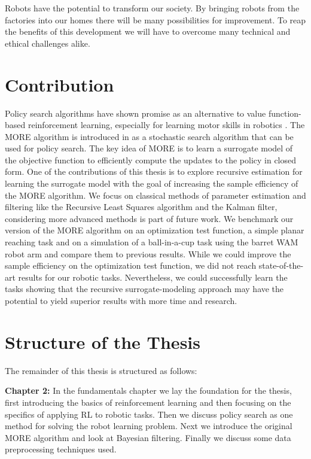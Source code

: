 Robots have the potential to transform our society. By
bringing robots from the factories into our homes there will be many
possibilities for improvement. To reap the benefits of this
development we will have to overcome many technical and
ethical challenges alike.



\section{Contribution}
Policy search algorithms have shown promise as an alternative
to value function-based reinforcement learning, especially for learning motor
skills in robotics \citep{deisenroth2013survey}.
The MORE algorithm is introduced in
\citet{abdolmaleki2015model} as a stochastic search algorithm that
can be used for policy search.
The key idea of MORE is to learn a surrogate model of
the objective function to efficiently compute the updates to
the policy in closed form. One of
the contributions of this thesis is to explore recursive estimation 
for learning the surrogate model
with the goal of increasing the sample efficiency of the MORE algorithm.
We focus on classical methods of parameter estimation and filtering
like the Recursive Least Squares algorithm and the Kalman filter,
considering more advanced methods is part of future work.
We benchmark our version of the MORE algorithm on an optimization test
function, a simple planar reaching task and on a simulation
of a ball-in-a-cup task using the barret WAM robot arm
and compare them to previous results. While we could improve the
sample efficiency on the optimization test function, we
did not reach state-of-the-art results for our robotic tasks.
Nevertheless, we could successfully learn the tasks showing
that the recursive surrogate-modeling approach may have  the potential to
yield superior results with more time and research.


\section{Structure of the Thesis}
The remainder of this thesis is structured as follows:

\textbf{Chapter 2:} In the fundamentals chapter we lay the foundation for
the thesis, first introducing the basics of reinforcement learning and
then focusing on the specifics of applying RL to robotic tasks.
Then we discuss policy search as one method for
solving the robot learning problem.
Next we introduce the original MORE algorithm and
look at Bayesian filtering. Finally we discuss some data preprocessing
techniques used.

